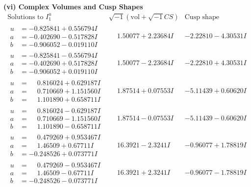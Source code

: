 \documentclass[1p]{elsarticle_modified}
\theoremstyle{definition}
\newcommand{\I}{\sqrt{-1}}
\begin{document}
\newpage\flushleft \textbf{(vi) Complex Volumes and Cusp Shapes}
$$\begin{array}{c|c|c}  
\text{Solutions to }I^u_{1}& \I (\text{vol} + \sqrt{-1}CS) & \text{Cusp shape}\\
 \hline 
\begin{aligned}
u &= -0.825841 + 0.556794 I \\
a &= -0.402690 - 0.517828 I \\
b &= -0.906052 - 0.019110 I\end{aligned}
 & \phantom{-}1.50077 + 2.23684 I & -2.22810 - 4.30531 I \\ \hline\begin{aligned}
u &= -0.825841 - 0.556794 I \\
a &= -0.402690 + 0.517828 I \\
b &= -0.906052 + 0.019110 I\end{aligned}
 & \phantom{-}1.50077 - 2.23684 I & -2.22810 + 4.30531 I \\ \hline\begin{aligned}
u &= \phantom{-}0.816024 + 0.629187 I \\
a &= \phantom{-}0.710669 + 1.151560 I \\
b &= \phantom{-}1.101890 + 0.658711 I\end{aligned}
 & \phantom{-}1.87514 + 0.07553 I & -5.11439 + 0.60620 I \\ \hline\begin{aligned}
u &= \phantom{-}0.816024 - 0.629187 I \\
a &= \phantom{-}0.710669 - 1.151560 I \\
b &= \phantom{-}1.101890 - 0.658711 I\end{aligned}
 & \phantom{-}1.87514 - 0.07553 I & -5.11439 - 0.60620 I \\ \hline\begin{aligned}
u &= \phantom{-}0.479269 + 0.953467 I \\
a &= \phantom{-}1.46509 + 0.67711 I \\
b &= -0.248526 + 0.073771 I\end{aligned}
 & \phantom{-}16.3921 - 2.3241 I & -0.96077 + 1.78819 I \\ \hline\begin{aligned}
u &= \phantom{-}0.479269 - 0.953467 I \\
a &= \phantom{-}1.46509 - 0.67711 I \\
b &= -0.248526 - 0.073771 I\end{aligned}
 & \phantom{-}16.3921 + 2.3241 I & -0.96077 - 1.78819 I \\ \hline\begin{aligned}

\end{aligned}
\end{array}$$
\end{document}
